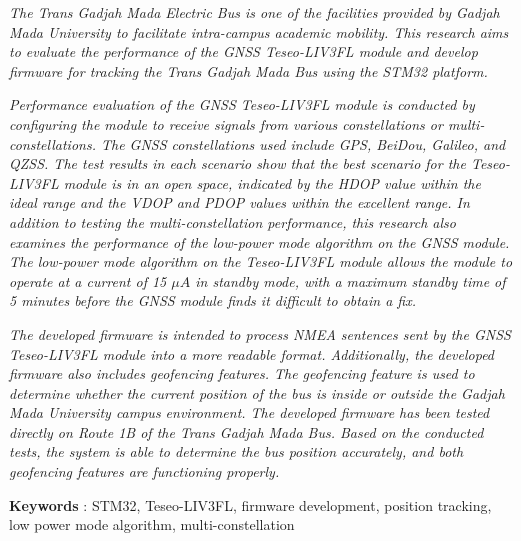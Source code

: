 \textit{The Trans Gadjah Mada Electric Bus is one of the facilities provided by Gadjah Mada University to facilitate intra-campus academic mobility. This research aims to evaluate the performance of the GNSS Teseo\hyp{}LIV3FL module and develop firmware for tracking the Trans Gadjah Mada Bus using the STM32 platform.}

\textit{Performance evaluation of the GNSS Teseo\hyp{}LIV3FL module is conducted by configuring the module to receive signals from various constellations or multi-constellations. The GNSS constellations used include GPS, BeiDou, Galileo, and QZSS. The test results in each scenario show that the best scenario for the Teseo\hyp{}LIV3FL module is in an open space, indicated by the HDOP value within the ideal range and the VDOP and PDOP values within the excellent range. In addition to testing the multi-constellation performance, this research also examines the performance of the low-power mode algorithm on the GNSS module. The low-power mode algorithm on the Teseo\hyp{}LIV3FL module allows the module to operate at a current of 15 $\mu A$ in standby mode, with a maximum standby time of 5 minutes before the GNSS module finds it difficult to obtain a fix.}

\textit{The developed firmware is intended to process NMEA sentences sent by the GNSS Teseo\hyp{}LIV3FL module into a more readable format. Additionally, the developed firmware also includes geofencing features. The geofencing feature is used to determine whether the current position of the bus is inside or outside the Gadjah Mada University campus environment. The developed firmware has been tested directly on Route 1B of the Trans Gadjah Mada Bus. Based on the conducted tests, the system is able to determine the bus position accurately, and both geofencing features are functioning properly.}

\noindent\textbf{Keywords} : STM32, Teseo\hyp{}LIV3FL, firmware development, position tracking, low power mode algorithm, multi-constellation
